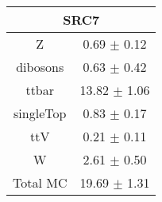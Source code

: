 \begin{tabular}{c|c}
\hline\hline
\multicolumn{2}{c}{\bf SRC7 } \\ \hline 
Z & 0.69 $\pm$ 0.12 \\
dibosons & 0.63 $\pm$ 0.42 \\
ttbar & 13.82 $\pm$ 1.06 \\
singleTop & 0.83 $\pm$ 0.17 \\
ttV & 0.21 $\pm$ 0.11 \\
W & 2.61 $\pm$ 0.50 \\
\hline
Total MC & 19.69 $\pm$ 1.31 \\
\hline\hline
\end{tabular}

